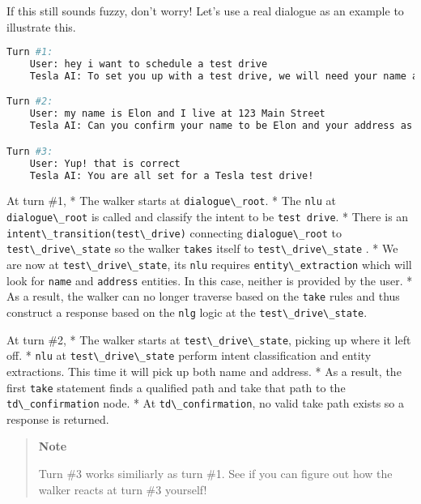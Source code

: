 If this still sounds fuzzy, don't worry! Let's use a real dialogue as an
example to illustrate this.

\begin{lstlisting}[language=bash]
Turn #1:
    User: hey i want to schedule a test drive
    Tesla AI: To set you up with a test drive, we will need your name and address.

Turn #2:
    User: my name is Elon and I live at 123 Main Street
    Tesla AI: Can you confirm your name to be Elon and your address as 123 Main Street?

Turn #3:
    User: Yup! that is correct
    Tesla AI: You are all set for a Tesla test drive!
\end{lstlisting}

At turn \#1, * The walker starts at
\passthrough{\lstinline!dialogue\_root!}. * The
\passthrough{\lstinline!nlu!} at
\passthrough{\lstinline!dialogue\_root!} is called and classify the
intent to be \passthrough{\lstinline!test drive!}. * There is an
\passthrough{\lstinline!intent\_transition(test\_drive)!} connecting
\passthrough{\lstinline!dialogue\_root!} to
\passthrough{\lstinline!test\_drive\_state!} so the walker
\passthrough{\lstinline!takes!} itself to
\passthrough{\lstinline!test\_drive\_state!} . * We are now at
\passthrough{\lstinline!test\_drive\_state!}, its
\passthrough{\lstinline!nlu!} requires
\passthrough{\lstinline!entity\_extraction!} which will look for
\passthrough{\lstinline!name!} and \passthrough{\lstinline!address!}
entities. In this case, neither is provided by the user. * As a result,
the walker can no longer traverse based on the
\passthrough{\lstinline!take!} rules and thus construct a response based
on the \passthrough{\lstinline!nlg!} logic at the
\passthrough{\lstinline!test\_drive\_state!}.

At turn \#2, * The walker starts at
\passthrough{\lstinline!test\_drive\_state!}, picking up where it left
off. * \passthrough{\lstinline!nlu!} at
\passthrough{\lstinline!test\_drive\_state!} perform intent
classification and entity extractions. This time it will pick up both
name and address. * As a result, the first
\passthrough{\lstinline!take!} statement finds a qualified path and take
that path to the \passthrough{\lstinline!td\_confirmation!} node. * At
\passthrough{\lstinline!td\_confirmation!}, no valid take path exists so
a response is returned.

\begin{quote}
\textbf{Note}

Turn \#3 works similiarly as turn \#1. See if you can figure out how the
walker reacts at turn \#3 yourself!
\end{quote}

